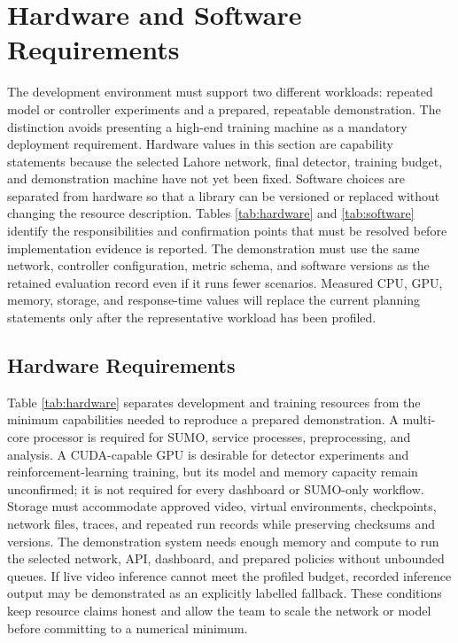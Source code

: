 \section{Hardware and Software Requirements}

The development environment must support two different workloads: repeated model or controller experiments and a prepared, repeatable demonstration. The distinction avoids presenting a high-end training machine as a mandatory deployment requirement. Hardware values in this section are capability statements because the selected Lahore network, final detector, training budget, and demonstration machine have not yet been fixed. Software choices are separated from hardware so that a library can be versioned or replaced without changing the resource description. Tables \ref{tab:hardware} and \ref{tab:software} identify the responsibilities and confirmation points that must be resolved before implementation evidence is reported. The demonstration must use the same network, controller configuration, metric schema, and software versions as the retained evaluation record even if it runs fewer scenarios. Measured CPU, GPU, memory, storage, and response-time values will replace the current planning statements only after the representative workload has been profiled.

\subsection{Hardware Requirements}

Table \ref{tab:hardware} separates development and training resources from the minimum capabilities needed to reproduce a prepared demonstration. A multi-core processor is required for SUMO, service processes, preprocessing, and analysis. A CUDA-capable GPU is desirable for detector experiments and reinforcement-learning training, but its model and memory capacity remain unconfirmed; it is not required for every dashboard or SUMO-only workflow. Storage must accommodate approved video, virtual environments, checkpoints, network files, traces, and repeated run records while preserving checksums and versions. The demonstration system needs enough memory and compute to run the selected network, API, dashboard, and prepared policies without unbounded queues. If live video inference cannot meet the profiled budget, recorded inference output may be demonstrated as an explicitly labelled fallback. These conditions keep resource claims honest and allow the team to scale the network or model before committing to a numerical minimum.

